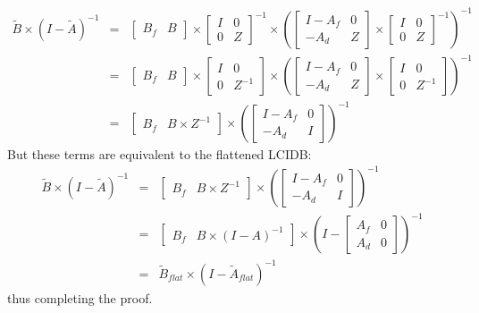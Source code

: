 \begin{eqnarray}
  \tilde{B}\times(I-\tilde{A})^{-1}
  &=& \left[\begin{array}{cc}B_f & B\end{array}\right]\times 
      \left[\begin{array}{cc}I & 0 \\ 0 & Z\end{array}\right]^{-1}\times
\left(
\left[\begin{array}{cc}I-A_f & 0 \\ -A_d & Z\end{array}\right]\times
    \left[\begin{array}{cc}I & 0 \\ 0 & Z\end{array}\right]^{-1}\right)^{-1}\\
  &=&   \left[\begin{array}{cc}B_f & B\end{array}\right]\times 
      \left[\begin{array}{cc}I & 0 \\ 0 & Z^{-1}\end{array}\right]\times
\left(
\left[\begin{array}{cc}I-A_f & 0 \\ -A_d & Z\end{array}\right]\times
\left[\begin{array}{cc}I & 0 \\ 0 & Z^{-1}\end{array}\right]\right)^{-1}\\
 &=& \left[\begin{array}{cc}B_f & B\times Z^{-1}\end{array}\right]\times
\left(\left[\begin{array}{cc}I-A_f & 0 \\ -A_d & I\end{array}\right]\right)^{-1}
\end{eqnarray}
But these terms are equivalent to the flattened LCIDB:
\begin{eqnarray}
  \tilde{B}\times(I-\tilde{A})^{-1} &=&
  \left[\begin{array}{cc}B_f & B\times Z^{-1}\end{array}\right]\times
\left(\left[\begin{array}{cc}I-A_f & 0 \\ -A_d & I\end{array}\right]\right)^{-1} \\
&=& \left[\begin{array}{cc}B_f & B\times (I-A)^{-1}\end{array}\right]\times
\left(I-\left[\begin{array}{cc}A_f & 0 \\ A_d & 0\end{array}\right]\right)^{-1}\\
&=& \tilde{B}_{flat}\times(I-\tilde{A}_{flat})^{-1}
\end{eqnarray}
thus completing the proof.
